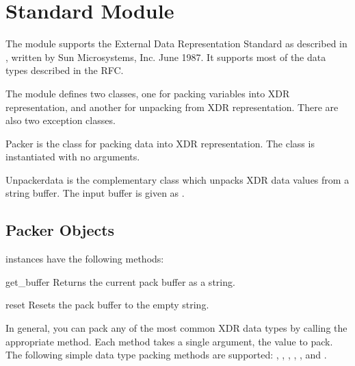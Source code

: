 \section{Standard Module }
\label{module-xdrlib}



The  module supports the External Data Representation
Standard as described in , written by Sun Microsystems,
Inc. June 1987.  It supports most of the data types described in the
RFC.

The  module defines two classes, one for packing
variables into XDR representation, and another for unpacking from XDR
representation.  There are also two exception classes.

\begin{classdesc}{Packer}{}
 is the class for packing data into XDR representation.
The  class is instantiated with no arguments.
\end{classdesc}

\begin{classdesc}{Unpacker}{data}
 is the complementary class which unpacks XDR data
values from a string buffer.  The input buffer is given as
.
\end{classdesc}


\subsection{Packer Objects}
\label{xdr-packer-objects}

 instances have the following methods:

\begin{funcdesc}{get_buffer}{}
Returns the current pack buffer as a string.
\end{funcdesc}

\begin{funcdesc}{reset}{}
Resets the pack buffer to the empty string.
\end{funcdesc}

In general, you can pack any of the most common XDR data types by
calling the appropriate  method.  Each method
takes a single argument, the value to pack.  The following simple data
type packing methods are supported: ,
, , ,
, and .

